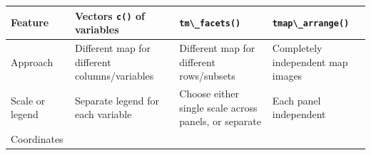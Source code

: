 \documentclass[
]{book}
\newcommand{\passthrough}[1]{#1}
\begin{document}
\begin{longtable}[]{@{}llll@{}}
\toprule
\begin{minipage}[b]{0.14\columnwidth}\raggedright
Feature\strut
\end{minipage} & \begin{minipage}[b]{0.31\columnwidth}\raggedright
Vectors \passthrough{\lstinline!c()!} of variables\strut
\end{minipage} & \begin{minipage}[b]{0.20\columnwidth}\raggedright
\passthrough{\lstinline!tm\_facets()!}\strut
\end{minipage} & \begin{minipage}[b]{0.24\columnwidth}\raggedright
\passthrough{\lstinline!tmap\_arrange()!}\strut
\end{minipage}\tabularnewline
\midrule
\endhead
\begin{minipage}[t]{0.14\columnwidth}\raggedright
Approach\strut
\end{minipage} & \begin{minipage}[t]{0.31\columnwidth}\raggedright
Different map for different columns/variables\strut
\end{minipage} & \begin{minipage}[t]{0.20\columnwidth}\raggedright
Different map for different rows/subsets\strut
\end{minipage} & \begin{minipage}[t]{0.24\columnwidth}\raggedright
Completely independent map images\strut
\end{minipage}\tabularnewline
\begin{minipage}[t]{0.14\columnwidth}\raggedright
Scale or legend\strut
\end{minipage} & \begin{minipage}[t]{0.31\columnwidth}\raggedright
Separate legend for each variable\strut
\end{minipage} & \begin{minipage}[t]{0.20\columnwidth}\raggedright
Choose either single scale across panels, or separate\strut
\end{minipage} & \begin{minipage}[t]{0.24\columnwidth}\raggedright
Each panel independent\strut
\end{minipage}\tabularnewline
\begin{minipage}[t]{0.14\columnwidth}\raggedright
Coordinates\strut
\end{minipage} & \begin{minipage}[t]{0.31\columnwidth}\raggedright

\end{minipage}
\end{longtable}
\end{document}

